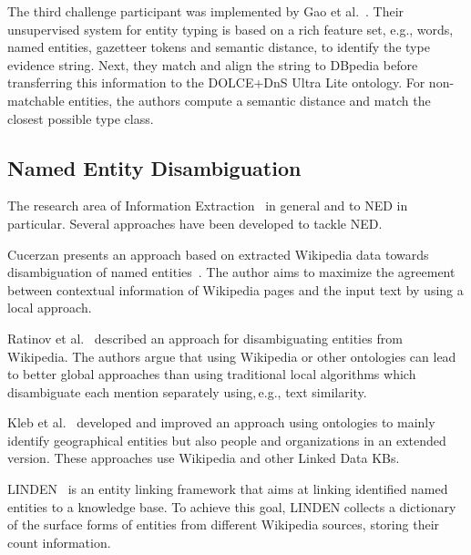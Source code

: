 The third challenge participant was implemented by Gao et al.~\cite{oak_sheffield}. 
Their unsupervised system for entity typing is based on a rich feature set, e.g., words, named entities, gazetteer tokens and semantic distance, to identify the type evidence string. 
Next, they match and align the string to DBpedia before transferring this information to the DOLCE+DnS Ultra Lite ontology.
For non-matchable entities, the authors compute a semantic distance and match the closest possible type class.  




\subsection{Named Entity Disambiguation}

The research area of Information Extraction~\cite{nad:sek} in general and to \ac{NED} in particular.
Several approaches have been developed to tackle \ac{NED}.
\bigskip


Cucerzan presents an approach based on extracted Wikipedia data towards disambiguation of named entities~\cite{Cucerzan07}.
The author aims to maximize the agreement between contextual information of Wikipedia pages and the input text by using a local approach.


Ratinov et al.~\cite{rat:rot} described an approach for disambiguating entities from Wikipedia. 
The authors argue that using Wikipedia or other ontologies can lead to better global approaches than using traditional local algorithms which disambiguate each mention separately using,\,e.g., text similarity. %

Kleb et al.~\cite{Kleb11WIMS,KlebESWC10} developed and improved an approach using ontologies to mainly identify geographical entities but also people and organizations in an extended version. 
These approaches use Wikipedia and other Linked Data \ac{KB}s.

LINDEN~\cite{LINDEN} is an entity linking framework that aims at linking identified named entities to a knowledge base.
To achieve this goal, LINDEN collects a dictionary of the surface forms of entities from different Wikipedia sources, storing their count information.

